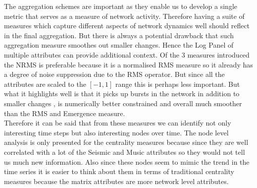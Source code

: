 The aggregation schemes are important as they enable us to develop a single metric that serves as a measure of network activity. Therefore having a suite of measures which capture different aspects of network dynamics well should reflect in the final aggregation. But there is always a potential drawback that such aggregation measure smoothes out smaller changes. Hence the Log Panel of multiple attributes can provide additional context. Of the 3 measures introduced the NRMS is preferable because it is a normalised RMS measure so it already has a degree of noise suppression due to the RMS operator. But since all the attributes are scaled to the $[-1,1]$ range this is perhaps less important. But what it highlights well is that it picks up bursts in the network in addition to smaller changes , is numerically better constrained and overall much smoother than the RMS and Emergence measure.\\

Therefore it can be said that from these measures we can identify not only interesting time steps but also interesting nodes over time. The node level analysis is only presented for the centrality measures because since they are well correlated with a lot of the Seismic and Music attributes so they would not tell us much new information. Also since these nodes seem to mimic the trend in the time series it is easier to think about them in terms of traditional centrality measures because the matrix attributes are more network level attributes. \\

